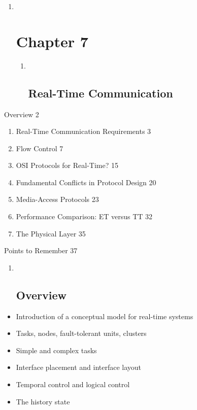 \begin{enumerate}
\item ~
  \section{Chapter 7}\label{chapter-7}

  \begin{enumerate}
  \item ~
    \subsection{Real-Time Communication}\label{real-time-communication}
  \end{enumerate}
\end{enumerate}

Overview 2

\begin{enumerate}
\def\labelenumi{\arabic{enumi}.}
\item
  Real-Time Communication Requirements 3
\item
  Flow Control 7
\item
  OSI Protocols for Real-Time? 15
\item
  Fundamental Conflicts in Protocol Design 20
\item
  Media-Access Protocols 23
\item
  Performance Comparison: ET versus TT 32
\item
  The Physical Layer 35
\end{enumerate}

Points to Remember 37

\begin{enumerate}
\item ~
  \subsection{}\label{section}

  \subsection{Overview}\label{overview}
\end{enumerate}

\begin{itemize}
\item
  Introduction of a conceptual model for real-time systems
\item
  Tasks, nodes, fault-tolerant units, clusters
\item
  Simple and complex tasks
\item
  Interface placement and interface layout
\item
  Temporal control and logical control
\item
  The history state
\end{itemize}

